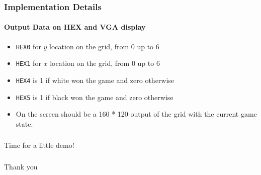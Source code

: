 \documentclass{beamer}
\begin{document}
\begin{frame}
    \frametitle{Implementation Details}
    \framesubtitle{Output Data on HEX and VGA display}
    \begin{itemize}
        \item \texttt{HEX0} for $y$ location on the grid, from 0 up to 6
        \item \texttt{HEX1} for $x$ location on the grid, from 0 up to 6
        \item \texttt{HEX4} is 1 if white won the game and zero otherwise
        \item \texttt{HEX5} is 1 if black won the game and zero otherwise 
        \item On the screen should be a 160 * 120 output of the grid with the current game state. 
    \end{itemize}
\end{frame}


\begin{frame}
    \frametitle{}
    \center \LARGE Time for a little demo!
\end{frame}

\begin{frame}
    \frametitle{}
    \center \LARGE Thank you
\end{frame}
\end{document}
